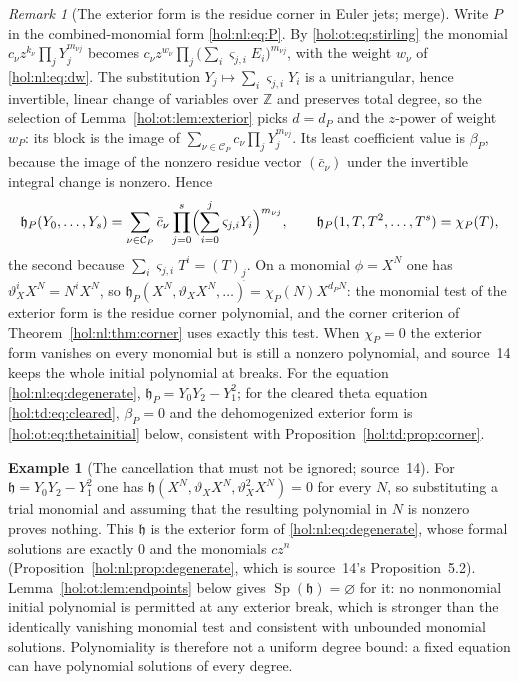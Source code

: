 \documentclass[11pt]{article}
\numberwithin{equation}{section}
\theoremstyle{definition}
\newtheorem{example}[theorem]{Example}
\theoremstyle{remark}
\newtheorem{remark}[theorem]{Remark}
\newcommand{\Z}{\mathbb Z}
\newcommand{\fall}[2]{(#1)_{\underline{#2}}}
\begin{document}
\begin{remark}[The exterior form is the residue corner in Euler jets; merge]
\label{hol:ot:rem:corner}
Write $P$ in the combined-monomial form \eqref{hol:nl:eq:P}. By
\eqref{hol:ot:eq:stirling} the monomial
$c_\nu z^{k_\nu}\prod_jY_j^{m_{\nu j}}$ becomes
$c_\nu z^{w_\nu}\prod_j\bigl(\sum_i\varsigma_{j,i}E_i\bigr)^{m_{\nu j}}$, with the
weight $w_\nu$ of \eqref{hol:nl:eq:dw}. The substitution
$Y_j\mapsto\sum_i\varsigma_{j,i}Y_i$ is a unitriangular, hence invertible, linear
change of variables over $\Z$ and preserves total degree, so the selection of
Lemma~\ref{hol:ot:lem:exterior} picks $d=d_P$ and the $z$-power of weight $w_P$:
its block is the image of $\sum_{\nu\in\mathcal C_P}c_\nu\prod_jY_j^{m_{\nu j}}$.
Its least coefficient value is $\beta_P$, because the image of the nonzero
residue vector $(\bar c_\nu)$ under the invertible integral change is nonzero.
Hence
\[
 \mathfrak h_P(Y_0,\ldots,Y_s)=\sum_{\nu\in\mathcal C_P}\bar c_\nu
 \prod_{j=0}^s\Bigl(\sum_{i=0}^j\varsigma_{j,i}Y_i\Bigr)^{m_{\nu j}},\qquad
 \mathfrak h_P(1,T,T^2,\ldots,T^s)=\chi_P(T),
\]
the second because $\sum_i\varsigma_{j,i}T^i=\fall Tj$. On a monomial $\phi=X^N$ one
has $\vartheta_X^iX^N=N^iX^N$, so
$\mathfrak h_P(X^N,\vartheta_XX^N,\ldots)=\chi_P(N)X^{d_PN}$: the monomial test
of the exterior form is the residue corner polynomial, and the corner
criterion of Theorem~\ref{hol:nl:thm:corner} uses exactly this test. When
$\chi_P=0$ the exterior form vanishes on every monomial but is still a
nonzero polynomial, and source~14 keeps the whole initial polynomial at
breaks. For the equation \eqref{hol:nl:eq:degenerate}, $\mathfrak
h_P=Y_0Y_2-Y_1^2$; for the cleared theta equation \eqref{hol:td:eq:cleared},
$\beta_P=0$ and the dehomogenized exterior form is
\eqref{hol:ot:eq:thetainitial} below, consistent with
Proposition~\ref{hol:td:prop:corner}.
\end{remark}

\begin{example}[The cancellation that must not be ignored; source~14]
\label{hol:ot:ex:degenerate}
For $\mathfrak h=Y_0Y_2-Y_1^2$ one has $\mathfrak h(X^N,\vartheta_XX^N,
\vartheta_X^2X^N)=0$ for every $N$, so substituting a trial monomial and
assuming that the resulting polynomial in $N$ is nonzero proves nothing. This
$\mathfrak h$ is the exterior form of \eqref{hol:nl:eq:degenerate}, whose
formal solutions are exactly $0$ and the monomials $cz^n$
(Proposition~\ref{hol:nl:prop:degenerate}, which is source~14's
Proposition~5.2). Lemma~\ref{hol:ot:lem:endpoints} below gives
$\operatorname{Sp}(\mathfrak h)=\varnothing$ for it: no nonmonomial initial
polynomial is permitted at any exterior break, which is stronger than the
identically vanishing monomial test and consistent with unbounded monomial
solutions. Polynomiality is therefore not a uniform degree bound: a fixed
equation can have polynomial solutions of every degree.
\end{example}
\end{document}
